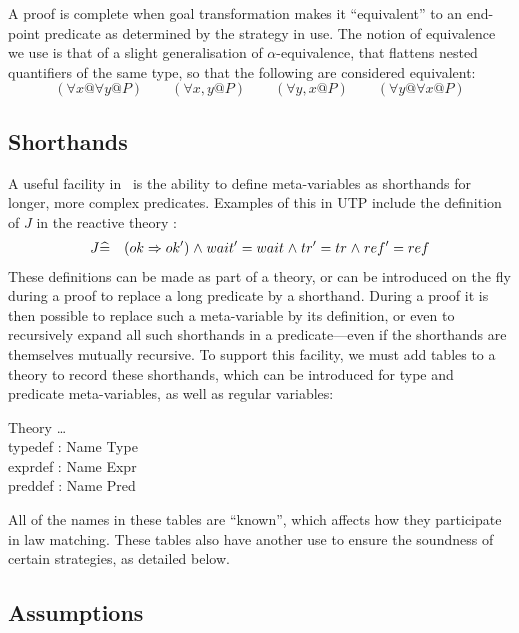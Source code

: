 A proof is complete when goal transformation
makes it ``equivalent'' to an end-point predicate
as determined by the strategy in use.
The notion of equivalence we use is that of
a slight generalisation of $\alpha$-equivalence,
that flattens nested quantifiers of the same type,
so that the following are considered equivalent:
\begin{equation*}
 (\forall x @ \forall y @ P)
 \qquad
 (\forall x,y @ P)
 \qquad
 (\forall y,x @ P)
 \qquad
 (\forall y @ \forall x @ P)
\end{equation*}



\subsection{Shorthands}\label{ssec:shorthands}

A useful facility in \STHN\ is the ability to define meta-variables
as shorthands for longer, more complex predicates.
Examples of this in UTP include the definition of $J$ in the
reactive theory \cite[Chp.8, p208]{UTP-book}:
\begin{eqnarray*}
  J &\widehat{=}& (ok \Rightarrow ok') \mathrel{\wedge} wait'=wait \mathrel{\wedge} tr'=tr \mathrel{\wedge} ref'=ref
\end{eqnarray*}
These definitions can be made as part of a theory,
or can be introduced on the fly during a proof to replace
a long predicate by a shorthand.
During a proof it is then possible to replace such a meta-variable
by its definition, or even to recursively expand all such shorthands
in a predicate---even if the shorthands are themselves mutually recursive.
To support this facility, we must add tables to a theory to record
these shorthands, which can be introduced for type and predicate
meta-variables, as well as regular variables:
\begin{schema}{Theory}
   \ldots
\\ typedef : Name \pfun Type
\\ exprdef : Name \pfun Expr
\\ preddef : Name \pfun Pred
\end{schema}
All of the names in these tables are ``known'',
which affects how they participate in law matching.
These tables also have another use to ensure the soundness
of certain strategies, as detailed below.

\subsection{Assumptions}

